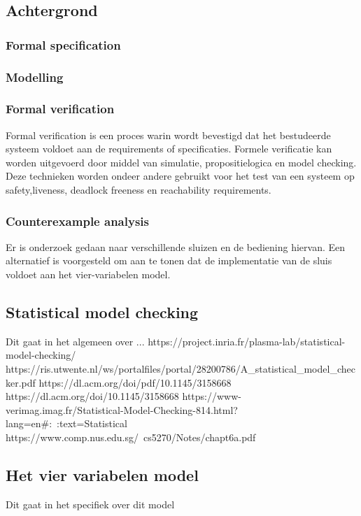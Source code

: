 \documentclass{article}
\begin{document}
	
	
	\subsection{Achtergrond}
	
	\subsubsection{Formal specification}
	
	\subsubsection{Modelling}
	
	\subsubsection{Formal verification}
	Formal verification is een proces warin wordt bevestigd dat het bestudeerde systeem voldoet aan de requirements of specificaties. Formele verificatie kan worden uitgevoerd door middel van simulatie, propositielogica en model checking. Deze technieken worden ondeer andere gebruikt voor het test van een systeem op safety,liveness, deadlock freeness en reachability requirements.
	
	\subsubsection{Counterexample analysis}
	Er is onderzoek gedaan naar verschillende sluizen en de bediening hiervan. 
	Een alternatief is voorgesteld om aan te tonen dat de implementatie van de sluis voldoet aan het vier-variabelen model.
	
	\subsection{Statistical model checking}
	Dit gaat in het algemeen over ...
	https://project.inria.fr/plasma-lab/statistical-model-checking/
	https://ris.utwente.nl/ws/portalfiles/portal/28200786/A_statistical_model_checker.pdf
	https://dl.acm.org/doi/pdf/10.1145/3158668
	https://dl.acm.org/doi/10.1145/3158668
	https://www-verimag.imag.fr/Statistical-Model-Checking-814.html?lang=en#:~:text=Statistical%
	https://www.comp.nus.edu.sg/~cs5270/Notes/chapt6a.pdf
	\subsection{Het vier variabelen model}
	Dit gaat in het specifiek  over  dit model
	
\end{document}
